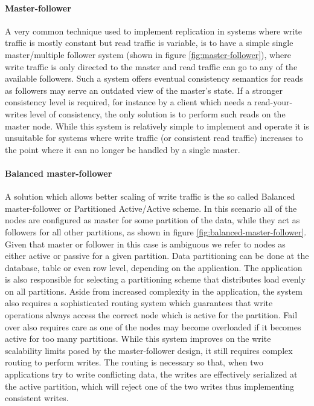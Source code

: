 \paragraph{Master-follower}
A very common technique used to implement replication in systems where write traffic is mostly constant but read traffic is variable, is to have a simple single master/multiple follower system (shown in figure \ref{fig:master-follower}), where write traffic is only directed to the master and read traffic can go to any of the available followers.
Such a system offers eventual consistency semantics for reads as followers may serve an outdated view of the master's state.
If a stronger consistency level is required, for instance by a client which needs a read-your-writes level of consistency, the only solution is to perform such reads on the master node.
While this system is relatively simple to implement and operate it is unsuitable for systems where write traffic (or consistent read traffic) increases to the point where it can no longer be handled by a single master.

\paragraph{Balanced master-follower}
A solution which allows better scaling of write traffic is the so called Balanced master-follower or Partitioned Active/Active scheme.
In this scenario all of the nodes are configured as master for some partition of the data, while they act as followers for all other partitions, as shown in figure \ref{fig:balanced-master-follower}.
Given that master or follower in this case is ambiguous we refer to nodes as either active or passive for a given partition.
Data partitioning can be done at the database, table or even row level, depending on the application.
The application is also responsible for selecting a partitioning scheme that distributes load evenly on all partitions.
Aside from increased complexity in the application, the system also requires a sophisticated routing system which guarantees that write operations always access the correct node which is active for the partition.
Fail over also requires care as one of the nodes may become overloaded if it becomes active for too many partitions.
While this system improves on the write scalability limits posed by the master-follower design, it still requires complex routing to perform writes.
The routing is necessary so that, when two applications try to write conflicting data, the writes are effectively serialized at the active partition, which will reject one of the two writes thus implementing consistent writes.

